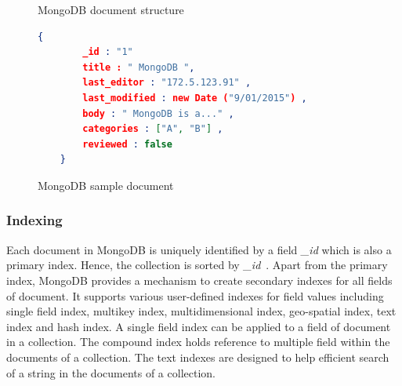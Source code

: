 \begin{figure}[h]
	\centering
	\centering
	\caption{MongoDB document structure~\citep{mongodb:org}}
	\label{fig:mongodb-doc}
	
\end{figure}

	\begin{figure}[h]
	\begin{lstlisting}[language=JSON,basicstyle=\ttfamily\footnotesize]
	{
		_id : "1"
		title : " MongoDB ",
		last_editor : "172.5.123.91" ,
		last_modified : new Date ("9/01/2015") ,
		body : " MongoDB is a..." ,
		categories : ["A", "B"] ,
		reviewed : false
	}
	\end{lstlisting} 
	\caption{MongoDB sample document}
	\label{sample-mongodb-document}
\end{figure}

\subsubsection{Indexing}\label{mong-xmark-indexing}

Each document in MongoDB is uniquely identified by a field \textit{\_id} which is also a primary index. Hence, the collection is sorted by \textit{\_id}~\citep{nosql/comparision}.
Apart from the primary index, MongoDB provides a mechanism to create secondary indexes for all fields of document. It supports various user-defined indexes for field values including single field index, multikey index, multidimensional index, geo-spatial index, text index and hash index. A single field index  can be applied to a field of document in a collection.  The compound index holds reference to multiple field within the documents of a collection. The text indexes are designed to help efficient search of a string in the documents of a collection.

